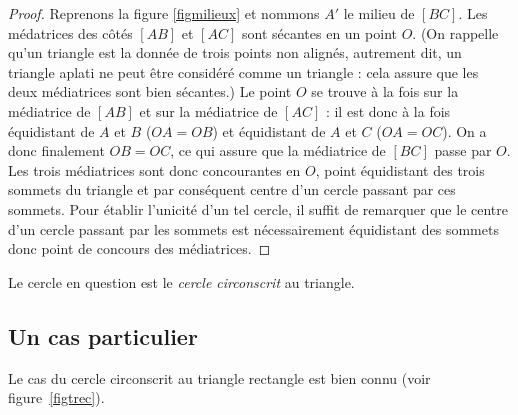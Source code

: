 \vspace{1ex}

\begin{figure}[ht]
\centering
{}
\figcaption{}\label{figcerccir}
\end{figure}



\begin{proof}
Reprenons la figure \ref{figmilieux} et nommons $A'$ le milieu de $[BC]$. Les médatrices des côtés $[AB]$ et $[AC]$ sont sécantes en un point $O$. (On rappelle qu'un triangle est la donnée de trois points non alignés, autrement dit, un triangle aplati ne peut être considéré comme un triangle : cela assure que les deux médiatrices sont bien sécantes.) Le point $O$ se trouve à la fois sur la médiatrice de $[AB]$ et sur la médiatrice de $[AC]$ : il est donc à la fois équidistant de $A$ et $B$ ($OA=OB$) et équidistant de $A$ et $C$ ($OA=OC$). On a donc finalement $OB=OC$, ce qui assure que la médiatrice de $[BC]$ passe par $O$. Les trois médiatrices sont donc concourantes en $O$, point équidistant des trois sommets du triangle et par conséquent centre d'un cercle passant par ces sommets. Pour établir l'unicité d'un tel cercle,  il suffit de remarquer que le centre d'un cercle passant par les sommets est nécessairement équidistant des sommets donc point de concours des médiatrices.
\end{proof}

Le cercle en question est le \emph{cercle circonscrit} au triangle. 

\subsection{Un cas particulier}
Le cas du cercle circonscrit au triangle rectangle est bien connu (voir figure \ref{figtrec}).

